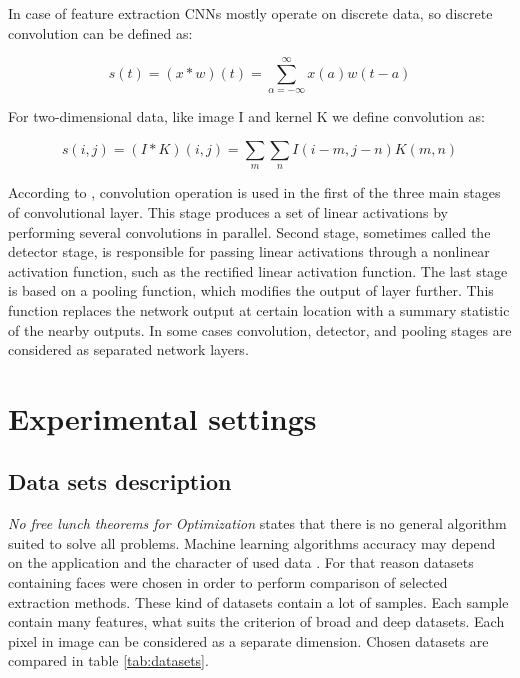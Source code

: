 \documentclass[a4paper, 10 pt, conference]{ieeeconf}
\begin{document}
In case of feature extraction CNNs mostly operate on discrete data, so discrete convolution can be defined as:

\begin{equation}
    s(t) = (x*w)(t) = \sum_{\alpha=-\infty}^{\infty} x(a)w(t-a)
\end{equation}

For two-dimensional data, like image I and kernel K we define convolution as:

\begin{equation}
    s(i, j) = (I*K)(i, j) = \sum_m \sum_n I(i-m, j-n)K(m, n)
\end{equation}

According to \cite{Goodfellow-et-al-2016}, convolution operation is used in the first of  the three main stages of convolutional layer. This stage produces a set of linear activations by performing several convolutions in parallel. Second stage, sometimes called the detector stage, is responsible for passing linear activations through a nonlinear activation function, such as the rectified linear activation function. The last stage is based on a pooling function, which modifies the output of layer further. This function replaces the network output at certain location with a summary statistic of the nearby outputs. In some cases convolution, detector, and pooling stages are considered as separated network layers.

\section{Experimental settings}

\subsection{Data sets description}

\textsl{No free lunch theorems for Optimization} \cite{no-free-lunch} states that there is no general algorithm suited to solve all problems. Machine learning algorithms accuracy may depend on the application and the character of used data \cite{alppaydin}. For that reason datasets containing faces were chosen in order to perform comparison of selected extraction methods. These kind of datasets contain a lot of samples. Each sample contain many features, what suits the criterion of broad and deep datasets. Each pixel in image can be considered as a separate dimension. Chosen datasets are compared in table \ref{tab:datasets}.
\end{document}
